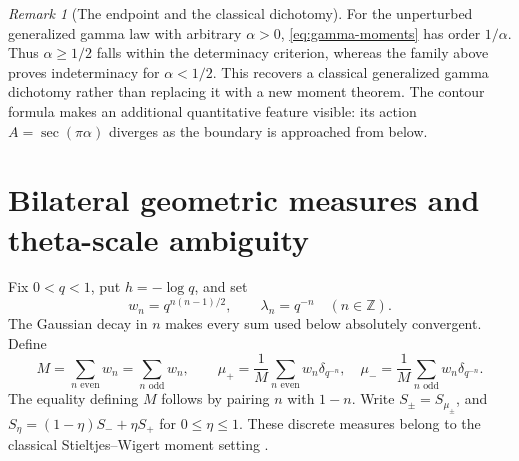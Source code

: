 \documentclass[11pt,a4paper]{article}
\numberwithin{equation}{section}
\theoremstyle{definition}
\theoremstyle{remark}
\newtheorem{remark}[theorem]{Remark}
\newcommand{\Z}{\mathbb Z}
\begin{document}
\begin{remark}[The endpoint and the classical dichotomy]
For the unperturbed generalized gamma law with arbitrary \(\alpha>0\),
\eqref{eq:gamma-moments} has order \(1/\alpha\). Thus
\(\alpha\ge1/2\) falls within the determinacy criterion, whereas the
family above proves indeterminacy for \(\alpha<1/2\). This recovers a
classical generalized gamma dichotomy rather than replacing it with a
new moment theorem. The contour formula makes an additional quantitative
feature visible: its action \(A=\sec(\pi\alpha)\) diverges as the
boundary is approached from below.
\end{remark}

\section{Bilateral geometric measures and theta-scale ambiguity}
\label{sec:qfamily}

Fix \(0<q<1\), put \(h=-\log q\), and set
\begin{equation}
 w_n=q^{n(n-1)/2},\qquad \lambda_n=q^{-n}
 \quad(n\in\Z).
\end{equation}
The Gaussian decay in \(n\) makes every sum used below absolutely
convergent. Define
\begin{equation}
 M=\sum_{n\text{ even}}w_n=\sum_{n\text{ odd}}w_n,
 \qquad
 \mu_+=\frac1M\sum_{n\text{ even}}w_n\delta_{q^{-n}},\quad
 \mu_-=\frac1M\sum_{n\text{ odd}}w_n\delta_{q^{-n}}.
 \label{eq:q-measures}
\end{equation}
The equality defining \(M\) follows by pairing \(n\) with \(1-n\).
Write \(S_\pm=S_{\mu_\pm}\), and
\(S_\eta=(1-\eta)S_-+\eta S_+\) for \(0\le\eta\le1\).
These discrete measures belong to the classical Stieltjes--Wigert
moment setting \cite{chihara,christiansen,christiansen-koelink}.
\end{document}
